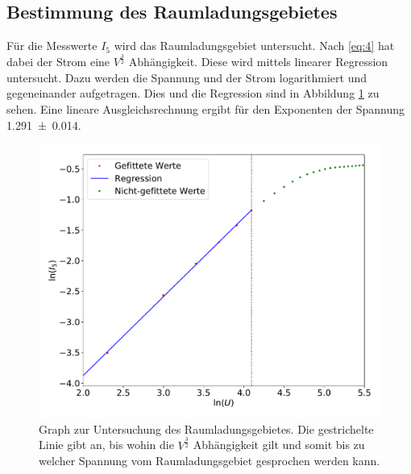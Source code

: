 \subsection{Bestimmung des Raumladungsgebietes}
Für die Messwerte $I_5$ wird das Raumladungsgebiet untersucht. Nach \eqref{eq:4} hat
dabei der Strom eine $V^{\frac{3}{2}}$ Abhängigkeit. Diese wird mittels linearer Regression untersucht.
Dazu werden die Spannung und der Strom logarithmiert und gegeneinander aufgetragen. Dies und die
Regression sind in Abbildung \ref{fig:2} zu sehen. Eine lineare Ausgleichsrechnung ergibt für
den Exponenten der Spannung \num{1.291(14)}.
\begin{figure}
  \centering
  \includegraphics[scale=0.3]{raumladung.pdf}
  \caption{Graph zur Untersuchung des Raumladungsgebietes. Die gestrichelte Linie gibt an,
  bis wohin die $V^{\frac{3}{2}}$ Abhängigkeit gilt und somit bis zu welcher Spannung vom
  Raumladungsgebiet gesprochen werden kann.}
  \label{fig:2}
\end{figure}

